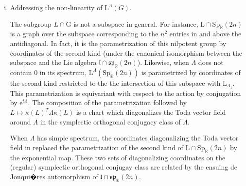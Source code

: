 \documentclass[reqno]{amsart}
\renewcommand{\ll}{\mathfrak{l}}
\renewcommand{\sp}{\mathfrak{sp}}
\newcommand{\R}{\mathbb{R}}
\newcommand{\Sl}{\mathrm{Sl}}
\newcommand{\Sp}{\mathrm{Sp}}
\renewcommand{\L}{\mathrm{L}}
\newcommand{\G}{\mathrm{G}}
\theoremstyle{definition} %
\begin{document}
\begin{enumerate}[(i)]
\[L=\mathrm{I} L\mathrm{I},\]
whereas the constrained $\mathrm{QLU}$ factorization in $\Sl_{\R}(2n)$ for $\Lambda$ returns
\[L=Q'L'U',\]
where neither $Q'$ nor $L'$ are  symplectic,
\[Q'=\begin{pmatrix} \mathrm{I}_n & 0 \\ 0 & Q'_4\end{pmatrix}, \, Q'_4\neq \mathrm{I}_n\,\Longrightarrow\, Q'\notin \Sp_\R(2n),\]
\[L'=\begin{pmatrix} L_1 & 0 \\ L_3' & L_4' \end{pmatrix},\, L'_4\in \L^{J\Lambda_1 J},\, L_4'\neq L_4=J{\left(L_{1}^{-1}\right)}^TJ\,\Longrightarrow\, L'\notin \Sp_\R(2n).\]


We do not know how to adapt the constrained $\mathrm{QLU}$ factorization in $\Sp_\R(2n)$ for those  $\Lambda$ whose spectrum contains 0.




 \item Addressing the non-linearity of $\L^\Lambda(G)$.

 The subgroup $L\cap \G$ is not a subspace in general. For instance, $\L\cap \Sp_\R(2n)$ is a graph over the subspace corresponding to the $n^2$ entries in and above the antidiagonal. In fact, it is the parametrization of this nilpotent group by coordinates of the second kind (under the canonical isomorphism between the subspace and the Lie algebra $\ll\cap \sp_\R(2n)$). Likewise, when $\Lambda$ does not contain 0 in its spectrum, $\L^\Lambda(\Sp_\R(2n))$ is parametrized by coordinates of the second kind restricted to the the intersection of this subspace  with $\L_{\Lambda_1}$.
 This parametrization is equivariant with respect to the action by conjugation by $\mathrm{e}^{t\Lambda}$.  The composition of the parametrization followed by $L\mapsto \kappa(L)^T\Lambda \kappa(L)$ is a chart which diagonalizes the Toda vector field around $\Lambda$ in the symplectic orthogonal conjugacy class of $\Lambda$.

 When $\Lambda$ has simple spectrum, the coordinates diagonalizing the Toda vector field in \cite{MT} replaced the parametrization of the second kind of $\L\cap \Sp_\R(2n)$ by the exponential map. These two sets of diagonalizing coordinates on the (regular) symplectic orthogonal conjugay class are related by the ensuing de Jonqui�res automorphism of $\ll\cap \sp_\R(2n)$.
\end{enumerate}
\end{document}

